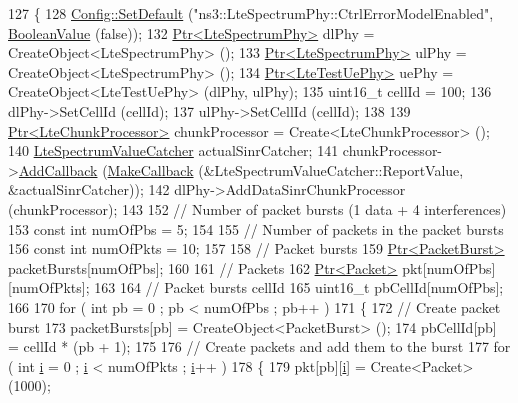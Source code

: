 \begin{DoxyCode}
127 \{
128   \hyperlink{group__config_ga2e7882df849d8ba4aaad31c934c40c06}{Config::SetDefault} (\textcolor{stringliteral}{"ns3::LteSpectrumPhy::CtrlErrorModelEnabled"}, 
      \hyperlink{classns3_1_1BooleanValue}{BooleanValue} (\textcolor{keyword}{false}));
132   \hyperlink{classns3_1_1Ptr}{Ptr<LteSpectrumPhy>} dlPhy = CreateObject<LteSpectrumPhy> ();
133   \hyperlink{classns3_1_1Ptr}{Ptr<LteSpectrumPhy>} ulPhy = CreateObject<LteSpectrumPhy> ();
134   \hyperlink{classns3_1_1Ptr}{Ptr<LteTestUePhy>} uePhy = CreateObject<LteTestUePhy> (dlPhy, ulPhy);
135   uint16\_t cellId = 100;
136   dlPhy->SetCellId (cellId);
137   ulPhy->SetCellId (cellId);
138 
139   \hyperlink{classns3_1_1Ptr}{Ptr<LteChunkProcessor>} chunkProcessor = Create<LteChunkProcessor> ();
140   \hyperlink{classns3_1_1LteSpectrumValueCatcher}{LteSpectrumValueCatcher} actualSinrCatcher;
141   chunkProcessor->\hyperlink{classns3_1_1LteChunkProcessor_a122d4a00d72e68a0a8b2cbdd165cdfd8}{AddCallback} (\hyperlink{group__makecallbackmemptr_ga9376283685aa99d204048d6a4b7610a4}{MakeCallback} (&LteSpectrumValueCatcher::ReportValue, 
      &actualSinrCatcher));
142   dlPhy->AddDataSinrChunkProcessor (chunkProcessor);
143 
152   \textcolor{comment}{// Number of packet bursts (1 data + 4 interferences)}
153   \textcolor{keyword}{const} \textcolor{keywordtype}{int} numOfPbs = 5;
154 
155   \textcolor{comment}{// Number of packets in the packet bursts}
156   \textcolor{keyword}{const} \textcolor{keywordtype}{int} numOfPkts = 10;
157 
158   \textcolor{comment}{// Packet bursts}
159   \hyperlink{classns3_1_1Ptr}{Ptr<PacketBurst>} packetBursts[numOfPbs];
160 
161   \textcolor{comment}{// Packets}
162   \hyperlink{classns3_1_1Ptr}{Ptr<Packet>} pkt[numOfPbs][numOfPkts];
163   
164   \textcolor{comment}{// Packet bursts cellId}
165   uint16\_t pbCellId[numOfPbs];
166 
170   \textcolor{keywordflow}{for} ( \textcolor{keywordtype}{int} pb = 0 ; pb < numOfPbs ; pb++ )
171     \{
172       \textcolor{comment}{// Create packet burst}
173       packetBursts[pb] = CreateObject<PacketBurst> ();
174       pbCellId[pb] = cellId * (pb + 1);
175 
176       \textcolor{comment}{// Create packets and add them to the burst}
177       \textcolor{keywordflow}{for} ( \textcolor{keywordtype}{int} \hyperlink{bernuolliDistribution_8m_a6f6ccfcf58b31cb6412107d9d5281426}{i} = 0 ; \hyperlink{bernuolliDistribution_8m_a6f6ccfcf58b31cb6412107d9d5281426}{i} < numOfPkts ; \hyperlink{bernuolliDistribution_8m_a6f6ccfcf58b31cb6412107d9d5281426}{i}++ )
178         \{
179           pkt[pb][\hyperlink{bernuolliDistribution_8m_a6f6ccfcf58b31cb6412107d9d5281426}{i}] = Create<Packet> (1000);

\end{DoxyCode}
